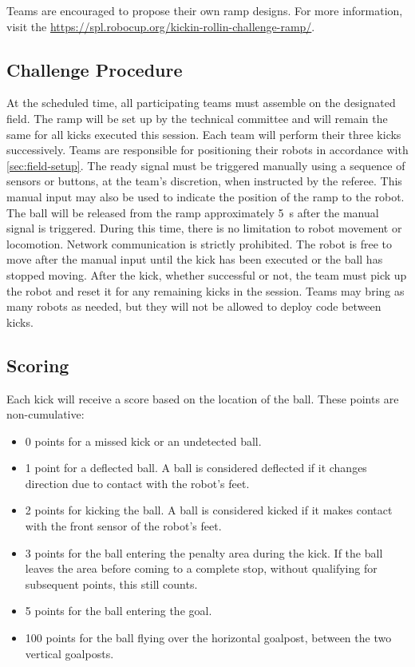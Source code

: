 Teams are encouraged to propose their own ramp designs. 
For more information, visit the \url{https://spl.robocup.org/kickin-rollin-challenge-ramp/}.

\subsection{Challenge Procedure}

At the scheduled time, all participating teams must assemble on the designated field.
The ramp will be set up by the technical committee and will remain the same for all kicks executed this session.
Each team will perform their three kicks successively.
Teams are responsible for positioning their robots in accordance with \cref{sec:field-setup}.
The ready signal must be triggered manually using a sequence of sensors or buttons, at the team’s discretion, when instructed by the referee.
This manual input may also be used to indicate the position of the ramp to the robot.
The ball will be released from the ramp approximately \qty{5}{\second} after the manual signal is triggered.
During this time, there is no limitation to robot movement or locomotion.
Network communication is strictly prohibited.
The robot is free to move after the manual input until the kick has been executed or the ball has stopped moving.
After the kick, whether successful or not, the team must pick up the robot and reset it for any remaining kicks in the session.
Teams may bring as many robots as needed, but they will not be allowed to deploy code between kicks.

\subsection{Scoring}

Each kick will receive a score based on the location of the ball.
These points are non-cumulative: 

\begin{itemize}
	\item 0 points for a missed kick or an undetected ball.
	\item 1 point for a deflected ball.
	A ball is considered deflected if it changes direction due to contact with the robot's feet.
	\item 2 points for kicking the ball.
	A ball is considered kicked if it makes contact with the front sensor of the robot's feet.
	\item 3 points for the ball entering the penalty area during the kick. 
	If the ball leaves the area before coming to a complete stop, without qualifying for subsequent points, this still counts. 
	\item 5 points for the ball entering the goal. 
	\item 100 points for the ball flying over the horizontal goalpost, between the two vertical goalposts. 
  \end{itemize}

